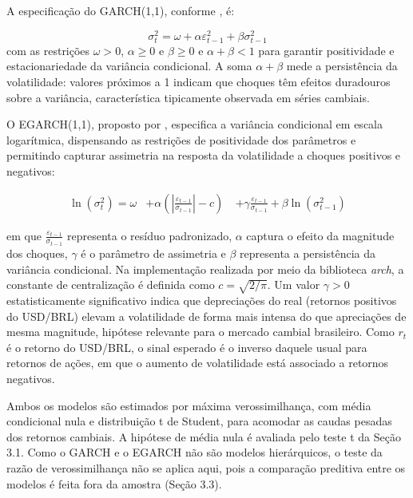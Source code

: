 A especificação do GARCH(1,1), conforme \textcite{bollerslev1986generalized}, é:

\begin{equation}
    \sigma_t^2 = \omega + \alpha \varepsilon_{t - 1}^2 +  \beta \sigma_{t-1}^2
\end{equation}
com as restrições $\omega > 0$, $\alpha \geq 0$ e $\beta \geq 0$ e $\alpha + \beta < 1$ para garantir positividade e estacionariedade da variância condicional. 
A soma $\alpha + \beta$ mede a persistência da volatilidade: valores próximos a 1 indicam que choques têm efeitos duradouros sobre a variância, característica 
tipicamente observada em séries cambiais.

O EGARCH(1,1), proposto por \textcite{nelson1991conditional}, especifica a variância condicional em escala logarítmica, dispensando as restrições de positividade dos parâmetros e 
permitindo capturar assimetria na resposta da volatilidade a choques positivos e negativos:

\begin{equation}
\begin{aligned}
\ln(\sigma_t^2) = \omega
&+ \alpha \left( \left| \frac{\varepsilon_{t-1}}{\sigma_{t-1}} \right| - c \right) \
&+ \gamma \frac{\varepsilon_{t-1}}{\sigma_{t-1}}
+ \beta \ln(\sigma_{t-1}^2)
\end{aligned}
\end{equation}

em que $\frac{\varepsilon_{t-1}}{\sigma_{t-1}}$ representa o resíduo padronizado, $\alpha$ captura o efeito da magnitude dos choques, $\gamma$ é o parâmetro de assimetria e $\beta$ representa a 
persistência da variância condicional. Na implementação realizada por meio da biblioteca \textit{arch}, a constante de centralização é definida como $c = \sqrt{2/\pi}$. Um valor $\gamma > 0$ 
estatisticamente significativo indica que depreciações do real (retornos positivos do USD/BRL) elevam a volatilidade de forma mais intensa do que apreciações de mesma magnitude, hipótese relevante 
para o mercado cambial brasileiro. Como $r_t$ é o retorno do USD/BRL, o sinal esperado é o inverso daquele usual para retornos de ações, em que o aumento de volatilidade está associado a retornos negativos.

Ambos os modelos são estimados por máxima verossimilhança, com média condicional nula e distribuição t de Student, para acomodar as caudas pesadas dos retornos cambiais. A hipótese de média nula 
é avaliada pelo teste t da Seção 3.1. Como o GARCH e o EGARCH não são modelos hierárquicos, o teste da razão de verossimilhança não se aplica aqui, pois a comparação preditiva entre 
os modelos é feita fora da amostra (Seção 3.3).

